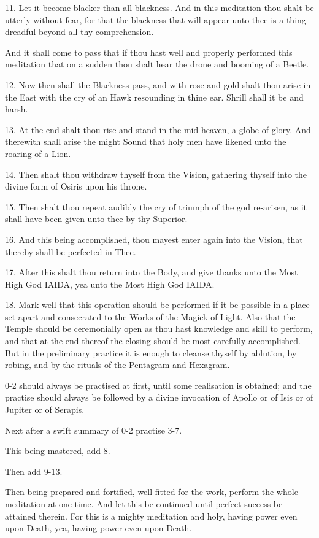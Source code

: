 11. Let it become blacker than all blackness. And in this meditation thou shalt be utterly without fear, for that the blackness that will appear unto thee is a thing dreadful beyond all thy comprehension.

And it shall come to pass that if thou hast well and properly performed this meditation that on a sudden thou shalt hear the drone and booming of a Beetle.

12. Now then shall the Blackness pass, and with rose and gold shalt thou arise in the East with the cry of an Hawk resounding in thine ear. Shrill shall it be and harsh.

13. At the end shalt thou rise and stand in the mid-heaven, a globe of glory. And therewith shall arise the might Sound that holy men have likened unto the roaring of a Lion.

14. Then shalt thou withdraw thyself from the Vision, gathering thyself into the divine form of Osiris upon his throne.

15. Then shalt thou repeat audibly the cry of triumph of the god re-arisen, as it shall have been given unto thee by thy Superior.

16. And this being accomplished, thou mayest enter again into the Vision, that thereby shall be perfected in Thee.

17. After this shalt thou return into the Body, and give thanks unto the Most High God IAIDA, yea unto the Most High God IAIDA.

18. Mark well that this operation should be performed if it be possible in a place set apart and consecrated to the Works of the Magick of Light. Also that the Temple should be ceremonially open as thou hast knowledge and skill to perform, and that at the end thereof the closing should be most carefully accomplished. But in the preliminary practice it is enough to cleanse thyself by ablution, by robing, and by the rituals of the Pentagram and Hexagram.

0-2 should always be practised at first, until some realisation is obtained; and the practise should always be followed by a divine invocation of Apollo or of Isis or of Jupiter or of Serapis.

Next after a swift summary of 0-2 practise 3-7.

This being mastered, add 8.

Then add 9-13.

Then being prepared and fortified, well fitted for the work, perform the whole meditation at one time. And let this be continued until perfect success be attained therein. For this is a mighty meditation and holy, having power even upon Death, yea, having power even upon Death.

